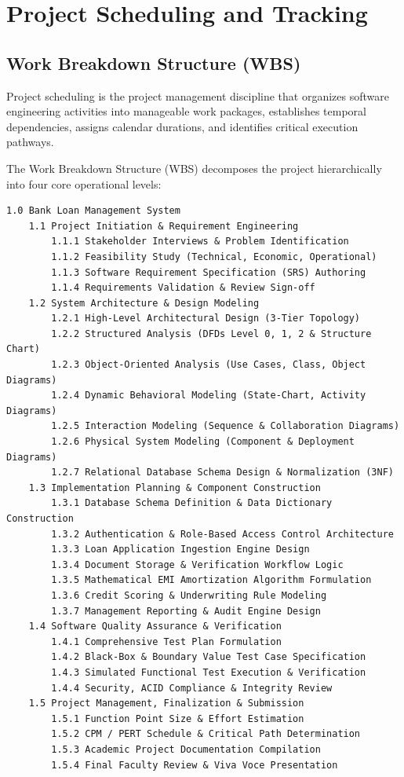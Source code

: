 \chapter{Project Scheduling and Tracking}

\section{Work Breakdown Structure (WBS)}

Project scheduling is the project management discipline that organizes software engineering activities into manageable work packages, establishes temporal dependencies, assigns calendar durations, and identifies critical execution pathways.

The Work Breakdown Structure (WBS) decomposes the project hierarchically into four core operational levels:

\begin{lstlisting}
1.0 Bank Loan Management System
    1.1 Project Initiation & Requirement Engineering
        1.1.1 Stakeholder Interviews & Problem Identification
        1.1.2 Feasibility Study (Technical, Economic, Operational)
        1.1.3 Software Requirement Specification (SRS) Authoring
        1.1.4 Requirements Validation & Review Sign-off
    1.2 System Architecture & Design Modeling
        1.2.1 High-Level Architectural Design (3-Tier Topology)
        1.2.2 Structured Analysis (DFDs Level 0, 1, 2 & Structure Chart)
        1.2.3 Object-Oriented Analysis (Use Cases, Class, Object Diagrams)
        1.2.4 Dynamic Behavioral Modeling (State-Chart, Activity Diagrams)
        1.2.5 Interaction Modeling (Sequence & Collaboration Diagrams)
        1.2.6 Physical System Modeling (Component & Deployment Diagrams)
        1.2.7 Relational Database Schema Design & Normalization (3NF)
    1.3 Implementation Planning & Component Construction
        1.3.1 Database Schema Definition & Data Dictionary Construction
        1.3.2 Authentication & Role-Based Access Control Architecture
        1.3.3 Loan Application Ingestion Engine Design
        1.3.4 Document Storage & Verification Workflow Logic
        1.3.5 Mathematical EMI Amortization Algorithm Formulation
        1.3.6 Credit Scoring & Underwriting Rule Modeling
        1.3.7 Management Reporting & Audit Engine Design
    1.4 Software Quality Assurance & Verification
        1.4.1 Comprehensive Test Plan Formulation
        1.4.2 Black-Box & Boundary Value Test Case Specification
        1.4.3 Simulated Functional Test Execution & Verification
        1.4.4 Security, ACID Compliance & Integrity Review
    1.5 Project Management, Finalization & Submission
        1.5.1 Function Point Size & Effort Estimation
        1.5.2 CPM / PERT Schedule & Critical Path Determination
        1.5.3 Academic Project Documentation Compilation
        1.5.4 Final Faculty Review & Viva Voce Presentation
\end{lstlisting}

